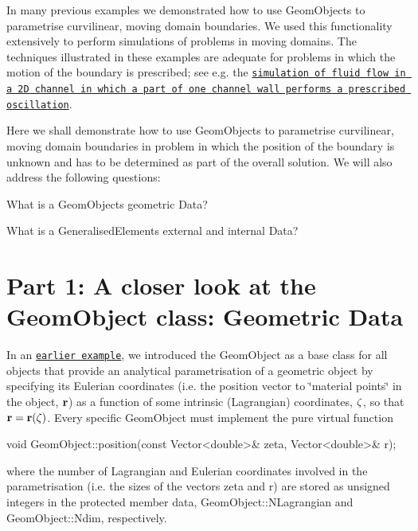 In many previous examples we demonstrated how to use {\ttfamily Geom\+Objects} to parametrise curvilinear, moving domain boundaries. We used this functionality extensively to perform simulations of problems in moving domains. The techniques illustrated in these examples are adequate for problems in which the motion of the boundary is prescribed; see e.\+g. the \href{../../../navier_stokes/collapsible_channel/html/index.html}{\tt simulation of fluid flow in a 2D channel in which a part of one channel wall performs a prescribed oscillation}.

Here we shall demonstrate how to use {\ttfamily Geom\+Objects} to parametrise curvilinear, moving domain boundaries in problem in which the position of the boundary is unknown and has to be determined as part of the overall solution. We will also address the following questions\+:
\begin{DoxyItemize}
\item What is a {\ttfamily Geom\+Object\textquotesingle{}s} geometric {\ttfamily Data}?
\item What is a {\ttfamily Generalised\+Element\textquotesingle{}s} external and internal {\ttfamily Data}?
\end{DoxyItemize}



 

\hypertarget{index_geom_data}{}\section{Part 1\+: A closer look at the Geom\+Object class\+: Geometric Data}\label{index_geom_data}
In an \href{../../../poisson/fish_poisson2/html/index.html}{\tt earlier example}, we introduced the {\ttfamily Geom\+Object} as a base class for all objects that provide an analytical parametrisation of a geometric object by specifying its Eulerian coordinates (i.\+e. the position vector to \char`\"{}material points\char`\"{} in the object, $ {\bf r}$) as a function of some intrinsic (Lagrangian) coordinates, $ {\bf \zeta} $, so that $ {\bf r} = {\bf r}({\bf \zeta})$. Every specific {\ttfamily Geom\+Object} must implement the pure virtual function


\begin{DoxyCode}
\textcolor{keywordtype}{void} GeomObject::position(\textcolor{keyword}{const} Vector<double>& zeta, Vector<double>& r);
\end{DoxyCode}


where the number of Lagrangian and Eulerian coordinates involved in the parametrisation (i.\+e. the sizes of the vectors {\ttfamily zeta} and {\ttfamily r}) are stored as unsigned integers in the protected member data, {\ttfamily Geom\+Object\+::\+N\+Lagrangian} and {\ttfamily Geom\+Object\+::\+Ndim}, respectively.

